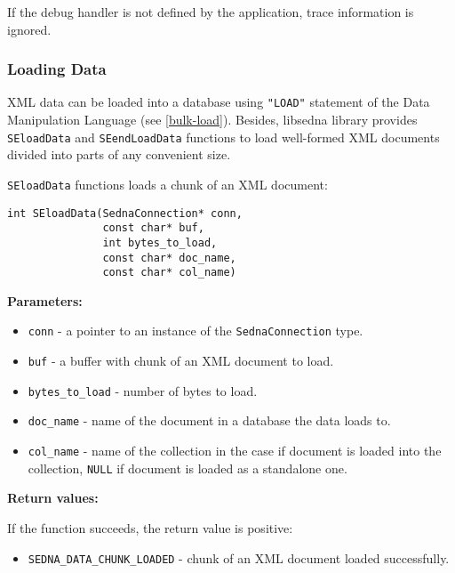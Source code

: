 \documentclass[a4paper,12pt]{article}
\newenvironment{citemize}
{\begin{itemize}
  \setlength{\itemsep}{0pt}
  \setlength{\parskip}{0pt}
  \setlength{\parsep}{0pt}}
{\end{itemize}}
\begin{document}
If the debug handler is not defined by the application, trace information is
ignored.


\subsubsection{Loading Data}

XML data can be loaded into a database using \verb!"LOAD"! statement of the Data
Manipulation Language (see \ref{bulk-load}). Besides, libsedna library provides
\verb!SEloadData! and \verb!SEendLoadData! functions to load well-formed XML
documents divided into parts of any convenient size.

\verb!SEloadData! functions loads a chunk of an XML document:

\begin{verbatim}
int SEloadData(SednaConnection* conn,
               const char* buf,
               int bytes_to_load,
               const char* doc_name,
               const char* col_name)
\end{verbatim}

\noindent
\textbf{Parameters:}

\begin{citemize}
\item\verb!conn! - a pointer to an instance of the \verb!SednaConnection! type.
\item\verb!buf! - a buffer with chunk of an XML document to load.
\item\verb!bytes_to_load! - number of bytes to load.
\item\verb!doc_name! - name of the document in a database the data loads to.
\item\verb!col_name! - name of the collection in the case if document is loaded
into the collection, \verb!NULL! if document is loaded as a standalone one.
\end{citemize}

\noindent
\textbf{Return values:}

\medskip

\noindent
If the function succeeds, the return value is positive:

\begin{citemize}
\item\verb!SEDNA_DATA_CHUNK_LOADED! - chunk of an XML document loaded
successfully.
\end{citemize}
\end{document}
